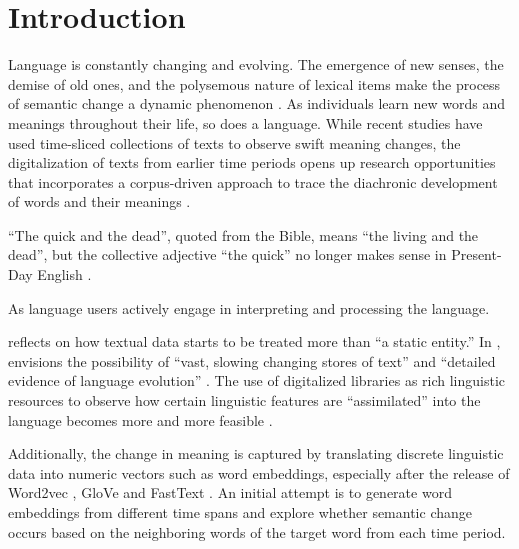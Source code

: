 

\chapter{Introduction}
Language is constantly changing and evolving. The emergence of new senses, the demise of old ones, and the polysemous nature of lexical items make the process of semantic change a dynamic phenomenon \parencite{robertinvanhove2008}. As individuals learn new words and meanings throughout their life, so does a language. While recent studies have used time-sliced collections of texts to observe swift meaning changes, the digitalization of texts from earlier time periods opens up research opportunities that incorporates a corpus-driven approach to trace the diachronic development of words and their meanings \parencite{kutuzov2018survey,tahmasebi2018survey,camacho2018survey}.

``The quick and the dead'', quoted from the Bible, means ``the living and the dead'', but the collective adjective ``the quick'' no longer makes sense in Present-Day English \parencite[199]{semanticincrowley2010}.

As language users actively engage in interpreting and processing the language.

\textcite{renouf2002time} reflects on how textual data starts to be treated more than ``a static entity.'' In \cite*{sinclair1982reflections}, \citeauthor{sinclair1982reflections} envisions the possibility of ``vast, slowing changing stores of text'' and ``detailed evidence of language evolution'' . The use of digitalized libraries as rich linguistic resources to observe how certain linguistic features are ``assimilated'' into the language becomes more and more feasible \parencite{renouf2002time}.

Additionally, the change in meaning is captured by translating discrete linguistic data into numeric vectors such as word embeddings, especially after the release of Word2vec \parencite{mikolov2013efficient}, GloVe \parencite{pennington2014glove} and FastText \parencite{bojanowski2016enriching}. An initial attempt is to generate word embeddings from different time spans and explore whether semantic change occurs based on the neighboring words of the target word from each time period.

